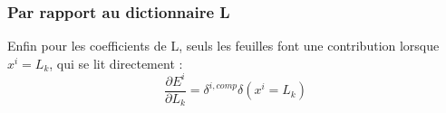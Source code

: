 \documentclass[conference]{IEEEtran}
\begin{document}
\subsubsection{Par rapport au dictionnaire L}
Enfin pour les coefficients de L, seuls les feuilles font une contribution lorsque $x^i=L_k$, qui se lit directement :
$$\frac{\partial E^i}{\partial L_k} = \delta^{i,comp}\delta(x^i=L_k)$$


%
%



%
%
\end{document}
